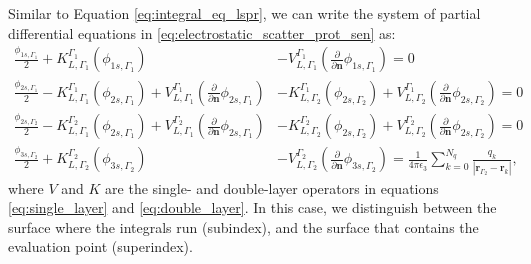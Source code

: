 Similar to Equation \eqref{eq:integral_eq_lspr}, we can write the system of partial differential equations in 
\eqref{eq:electrostatic_scatter_prot_sen} as:
%
\begin{align} \label{eq:integral_eq_lspr_nobc_system}
\frac{\phi_{1s,\Gamma_1}}{2}+ K_{L,\Gamma_1}^{\Gamma_1}(\phi_{1s,\Gamma_1}) &- V_{L,\Gamma_1}^{\Gamma_1} \left(\frac{\partial}{\partial \mathbf{n}}\phi_{1s,\Gamma_1} \right) = 0  \nonumber \\
\frac{\phi_{2s,\Gamma_1}}{2} - K_{L,\Gamma_1}^{\Gamma_1}(\phi_{2s,\Gamma_1}) + V_{L,\Gamma_1}^{\Gamma_1} \left(\frac{\partial}{\partial \mathbf{n}}\phi_{2s,\Gamma_1} \right) 
& - K_{L,\Gamma_2}^{\Gamma_1}(\phi_{2s,\Gamma_2}) + V_{L,\Gamma_2}^{\Gamma_1} \left(\frac{\partial}{\partial \mathbf{n}}\phi_{2s,\Gamma_2} \right) = 0  \nonumber \\
\frac{\phi_{2s,\Gamma_2}}{2} - K_{L,\Gamma_1}^{\Gamma_2}(\phi_{2s,\Gamma_1}) + V_{L,\Gamma_1}^{\Gamma_2} \left(\frac{\partial}{\partial \mathbf{n}}\phi_{2s,\Gamma_1} \right)  
&- K_{L,\Gamma_2}^{\Gamma_2}(\phi_{2s,\Gamma_2}) + V_{L,\Gamma_2}^{\Gamma_2} \left(\frac{\partial}{\partial \mathbf{n}}\phi_{2s,\Gamma_2} \right) = 0  \nonumber \\
\frac{\phi_{3s,\Gamma_2}}{2} + K_{L,\Gamma_2}^{\Gamma_2}(\phi_{3s,\Gamma_2}) &- V_{L,\Gamma_2}^{\Gamma_2} \left( \frac{\partial}{\partial \mathbf{n}} \phi_{3s,\Gamma_2} \right) = \frac{1}{4\pi\epsilon_3} \sum_{k=0}^{N_q} \frac{q_k}{|\mathbf{r}_{\Gamma_2} - \mathbf{r}_k|} ,
\end{align}
%
where $V$ and $K$ are the single- and double-layer operators in equations 
\eqref{eq:single_layer} and \eqref{eq:double_layer}. In this case, we distinguish between the
surface where the integrals run (subindex), and the surface that contains the evaluation point (superindex).

